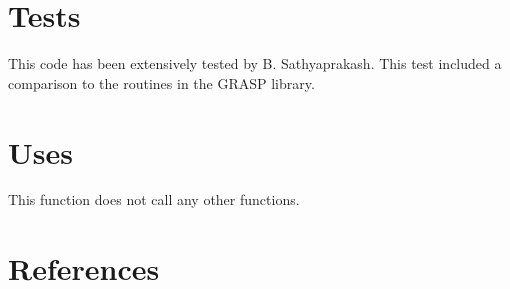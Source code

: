 \documentclass[12pt]{article}
\begin{document}
\section{Tests}

This code has been extensively tested by B. Sathyaprakash. This test included a comparison to the routines in the GRASP library.

\section{Uses}

This function does not call any other functions.


\section{References}
\end{document}
